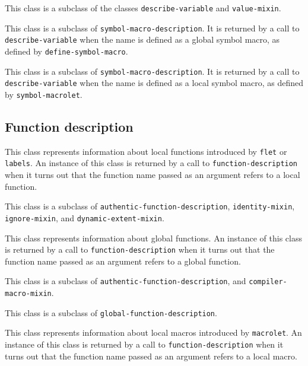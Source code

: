 This class is a subclass of the classes \texttt{describe-variable} and
\texttt{value-mixin}.

{\footnotesize
{}
}

This class is a subclass of \texttt{symbol-macro-description}.  It is
returned by a call to \texttt{describe-variable} when the name is
defined as a global symbol macro, as defined by
\texttt{define-symbol-macro}.

{\footnotesize
{}
}

This class is a subclass of \texttt{symbol-macro-description}.  It is
returned by a call to \texttt{describe-variable} when the
name is defined as a local symbol macro, as defined by
\texttt{symbol-macrolet}.

\subsection{Function description}
\label{sec-instantiable-classes-function-desciption}

{\footnotesize
{}
}

This class represents information about local functions introduced by
\texttt{flet} or \texttt{labels}.  An instance of this class is
returned by a call to \texttt{function-description} when it turns out that
the function name passed as an argument refers to a local function.

This class is a subclass of \texttt{authentic-function-description},
\texttt{identity-mixin}, \texttt{ignore-mixin}, and \texttt{dynamic-extent-mixin}.

{\footnotesize
{}
}

This class represents information about global functions.  An instance
of this class is returned by a call to \texttt{function-description} when it
turns out that the function name passed as an argument refers to a
global function.

This class is a subclass of \texttt{authentic-function-description},
and \texttt{compiler-macro-mixin}.

{\footnotesize
{}
}

This class is a subclass of \texttt{global-function-description}.

{\footnotesize
{}
}

This class represents information about local macros introduced by
\texttt{macrolet}.  An instance of this class is returned by a call to
\texttt{function-description} when it turns out that the function name passed
as an argument refers to a local macro.

